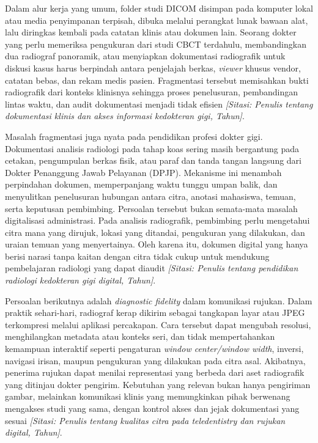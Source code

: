 \documentclass[12pt,a4paper,oneside]{report}
\newcommand{\sitasi}[1]{\textit{[Sitasi: #1]}}
\begin{document}
Dalam alur kerja yang umum, folder studi DICOM disimpan pada komputer lokal atau media penyimpanan terpisah, dibuka melalui perangkat lunak bawaan alat, lalu diringkas kembali pada catatan klinis atau dokumen lain. Seorang dokter yang perlu memeriksa pengukuran dari studi CBCT terdahulu, membandingkan dua radiograf panoramik, atau menyiapkan dokumentasi radiografik untuk diskusi kasus harus berpindah antara penjelajah berkas, \textit{viewer} khusus vendor, catatan bebas, dan rekam medis pasien. Fragmentasi tersebut memisahkan bukti radiografik dari konteks klinisnya sehingga proses penelusuran, pembandingan lintas waktu, dan audit dokumentasi menjadi tidak efisien \sitasi{Penulis tentang dokumentasi klinis dan akses informasi kedokteran gigi, Tahun}.

Masalah fragmentasi juga nyata pada pendidikan profesi dokter gigi. Dokumentasi analisis radiologi pada tahap koas sering masih bergantung pada cetakan, pengumpulan berkas fisik, atau paraf dan tanda tangan langsung dari Dokter Penanggung Jawab Pelayanan (DPJP). Mekanisme ini menambah perpindahan dokumen, memperpanjang waktu tunggu umpan balik, dan menyulitkan penelusuran hubungan antara citra, anotasi mahasiswa, temuan, serta keputusan pembimbing. Persoalan tersebut bukan semata-mata masalah digitalisasi administrasi. Pada analisis radiografik, pembimbing perlu mengetahui citra mana yang dirujuk, lokasi yang ditandai, pengukuran yang dilakukan, dan uraian temuan yang menyertainya. Oleh karena itu, dokumen digital yang hanya berisi narasi tanpa kaitan dengan citra tidak cukup untuk mendukung pembelajaran radiologi yang dapat diaudit \sitasi{Penulis tentang pendidikan radiologi kedokteran gigi digital, Tahun}.

Persoalan berikutnya adalah \textit{diagnostic fidelity} dalam komunikasi rujukan. Dalam praktik sehari-hari, radiograf kerap dikirim sebagai tangkapan layar atau JPEG terkompresi melalui aplikasi percakapan. Cara tersebut dapat mengubah resolusi, menghilangkan metadata atau konteks seri, dan tidak mempertahankan kemampuan interaktif seperti pengaturan \textit{window center/window width}, inversi, navigasi irisan, maupun pengukuran yang dilakukan pada citra asal. Akibatnya, penerima rujukan dapat menilai representasi yang berbeda dari aset radiografik yang ditinjau dokter pengirim. Kebutuhan yang relevan bukan hanya pengiriman gambar, melainkan komunikasi klinis yang memungkinkan pihak berwenang mengakses studi yang sama, dengan kontrol akses dan jejak dokumentasi yang sesuai \sitasi{Penulis tentang kualitas citra pada teledentistry dan rujukan digital, Tahun}.
\end{document}
